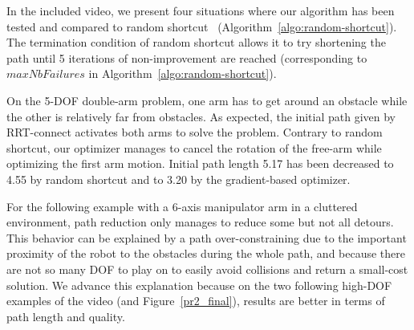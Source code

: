 \documentclass{tADR2e}
\begin{document}
In the included video, we present four situations where our algorithm has been 
tested and compared to random shortcut~\cite{randomShortcutHPP}
(Algorithm~\ref{algo:random-shortcut}).
The termination condition of random shortcut allows it to try 
shortening the path until 5 iterations of non-improvement are reached 
(corresponding to $maxNbFailures$ in Algorithm~\ref{algo:random-shortcut}).

On the 5-DOF double-arm problem, one arm has to get around an obstacle while the 
other is relatively far from obstacles. As expected, the initial path given by 
RRT-connect activates both arms to solve the problem. Contrary to random shortcut, 
our optimizer manages to cancel the rotation of the free-arm while optimizing the 
first arm motion. Initial path length 5.17 has been decreased to 4.55 by random shortcut and to 3.20 by the gradient-based optimizer.


For the following example with a 6-axis manipulator arm 
in a  cluttered environment, path reduction only manages to reduce some but not 
all detours. This behavior can be explained by a path over-constraining due to the 
important proximity of the robot to the obstacles during the whole path, and 
because there are not so many DOF to play on to easily avoid collisions and 
return a small-cost solution.
We advance this explanation because on the two following high-DOF examples of the video (and Figure~\ref{pr2_final}), results are better 
in terms of path length and quality.
\end{document}

